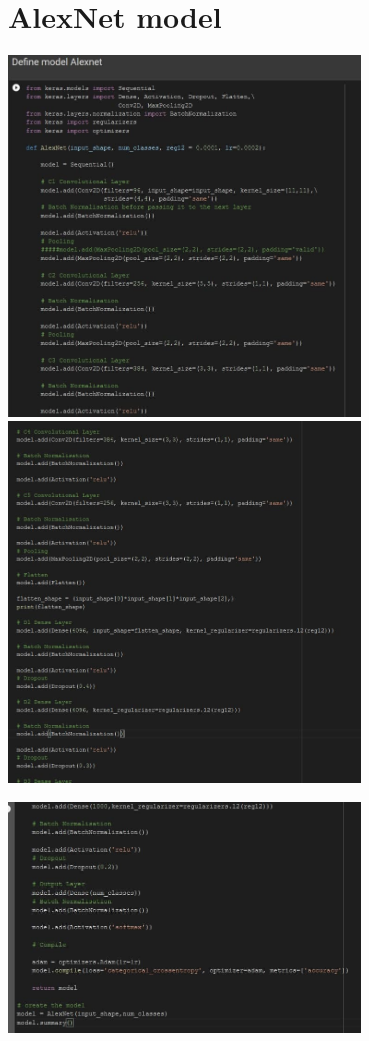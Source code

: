 \documentclass[11pt]{scrartcl}
\begin{document}
{{\newpage
\section{AlexNet model}

\begin{center}

\hspace{+0.2in}\includegraphics[width=0.7\textwidth]{Alex1.png}
\vspace{0.1cm}
\newpage
\hspace{+0.2in}\includegraphics[width=0.7\textwidth]{Alex2.png}


\vspace{0.1cm}
\hspace{+0.2in}\includegraphics[width=0.7\textwidth]{Alex3.png}
\vspace{0.3cm}
\end{center}


}}
\end{document}
